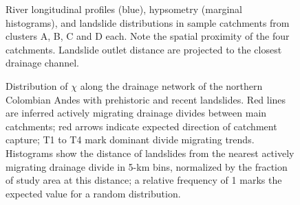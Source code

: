 \documentclass[draft]{agujournal2019}
\begin{document}
\begin{figure}[ht!]
    \caption{River longitudinal profiles (blue), hypsometry (marginal histograms), and landslide distributions in sample catchments from clusters A, B, C and D each. Note the spatial proximity of the four catchments. Landslide outlet distance are projected to the closest drainage channel.}
    \label{fig:cluster-profile}
\end{figure}

\begin{figure}[ht!]
    \caption{Distribution of $\chi$ along the drainage network of the northern Colombian Andes with prehistoric and recent landslides. Red lines are inferred actively migrating drainage divides between main catchments; red arrows indicate expected direction of catchment capture; T1 to T4 mark dominant divide migrating trends. Histograms show the distance of landslides from the nearest actively migrating drainage divide in 5-km bins, normalized by the fraction of study area at this distance; a relative frequency of 1 marks the expected value for a random distribution.}
    \label{fig:rel-rec}
\end{figure}
\end{document}
